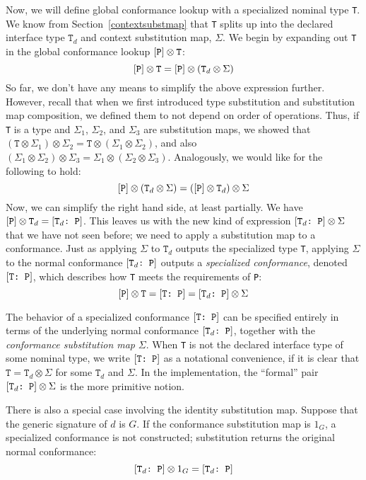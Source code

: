 \documentclass[../generics]{subfiles}
\begin{document}
Now, we will define global conformance lookup with a specialized nominal type \texttt{T}. We know from Section~\ref{contextsubstmap} that \texttt{T} splits up into the declared interface type $\texttt{T}_d$ and context substitution map, $\Sigma$. We begin by expanding out \texttt{T} in the global conformance lookup $[\texttt{P}]\otimes\texttt{T}$:
\[
[\texttt{P}]\otimes\texttt{T} = [\texttt{P}] \otimes (\texttt{T}_d \otimes \Sigma)
\]
So far, we don't have any means to simplify the above expression further. However, recall that when we first introduced type substitution and substitution map composition, we defined them to not depend on order of operations. Thus, if \texttt{T} is a type and $\Sigma_1$, $\Sigma_2$, and $\Sigma_3$ are substitution maps, we showed that $(\texttt{T}\otimes\Sigma_1)\otimes\Sigma_2=\texttt{T}\otimes(\Sigma_1\otimes\Sigma_2)$, and also $(\Sigma_1\otimes\Sigma_2)\otimes\Sigma_3=\Sigma_1\otimes(\Sigma_2\otimes\Sigma_3)$. Analogously, we would like for the following to hold:
\[
[\texttt{P}] \otimes (\texttt{T}_d \otimes \Sigma) = ([\texttt{P}] \otimes \texttt{T}_d) \otimes \Sigma
\]
Now, we can simplify the right hand side, at least partially. We have $[\texttt{P}]\otimes\texttt{T}_d=[\texttt{$\texttt{T}_d$:~P}]$. This leaves us with the new kind of expression $[\texttt{$\texttt{T}_d$:~P}]\otimes\Sigma$ that we have not seen before; we need to apply a substitution map to a conformance. Just as applying $\Sigma$ to $\texttt{T}_d$ outputs the specialized type \texttt{T}, applying $\Sigma$ to the normal conformance $[\texttt{$\texttt{T}_d$:~P}]$ outputs a \emph{specialized conformance}, denoted $[\texttt{T:~P}]$, which describes how \texttt{T} meets the requirements of \texttt{P}:
\[[\texttt{P}]\otimes\texttt{T}=[\texttt{T:~P}]=[\texttt{$\texttt{T}_d$:~P}]\otimes\Sigma\]

The behavior of a specialized conformance $[\texttt{T:~P}]$ can be specified entirely in terms of the underlying normal conformance $[\texttt{$\texttt{T}_d$:~P}]$, together with the \emph{conformance substitution map} $\Sigma$. When \texttt{T} is not the declared interface type of some nominal type, we write $[\texttt{T:~P}]$ as a notational convenience, if it is clear that $\texttt{T}=\texttt{T}_d\otimes\Sigma$ for some $\texttt{T}_d$ and $\Sigma$. In the implementation, the ``formal'' pair $[\texttt{$\texttt{T}_d$:~P}]\otimes\Sigma$ is the more primitive notion.

There is also a special case involving the identity substitution map. Suppose that the generic signature of $d$ is $G$. If the conformance substitution map is $1_G$, a specialized conformance is not constructed; substitution returns the original normal conformance:
\[
[\texttt{$\texttt{T}_d$:~P}] \otimes 1_G = [\texttt{$\texttt{T}_d$:~P}]
\]
\end{document}
